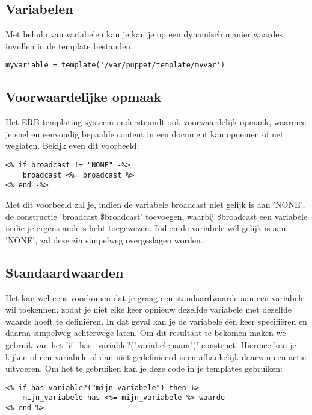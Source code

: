 \subsection{Variabelen}
Met behulp van variabelen kan je kan je op een dynamisch manier waardes invullen in de template bestanden.
%
\begin{code}
\begin{lstlisting}
myvariable = template('/var/puppet/template/myvar')
\end{lstlisting}
\end{code}
%
\subsection{Voorwaardelijke opmaak}
%
Het ERB templating systeem ondersteundt ook voorwaardelijk opmaak, waarmee je snel en eenvoudig bepaalde content in een document kan opnemen of net weglaten. Bekijk even dit voorbeeld:
\begin{code}
\begin{lstlisting}
<% if broadcast != "NONE" -%>
	broadcast <%= broadcast %>
<% end -%>
\end{lstlisting}
\end{code}
%
Met dit voorbeeld zal je, indien de variabele broadcast niet gelijk is aan 'NONE', de constructie 'broadcast \$broadcast' toevoegen, waarbij \$broadcast een variabele is die je ergens anders hebt toegewezen. Indien de variabele w\'{e}l gelijk is aan 'NONE', zal deze zin simpelweg overgeslagen worden.
%
\subsection{Standaardwaarden}
Het kan wel eens voorkomen dat je graag een standaardwaarde aan een variabele wil toekennen, zodat je niet elke keer opnieuw dezelfde variabele met dezelfde waarde hoeft te defini\"eren. In dat geval kan je de variabele \'e\'en keer specifi\"eren en daarna simpelweg achterwege laten. Om dit resultaat te bekomen maken we gebruik van het 'if\_has\_variable?("variabelenaam")' construct. Hiermee kan je kijken of een variabele al dan niet gedefini\"eerd is en afhankelijk daarvan een actie uitvoeren. Om het te gebruiken kan je deze code in je templates gebruiken:
%
\begin{code}
\begin{lstlisting}
<% if has_variable?("mijn_variabele") then %>
	mijn_variabele has <%= mijn_variabele %> waarde
<% end %>
\end{lstlisting}
\end{code}
%
